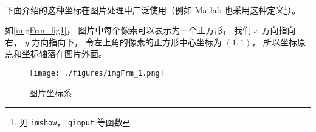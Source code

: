 
下面介绍的这种坐标在图片处理中广泛使用（例如 Matlab 也采用这种定义\footnote{见 \lstinline|imshow|， \lstinline|ginput| 等函数}）。

如\autoref{imgFrm_fig1}， 图片中每个像素可以表示为一个正方形， 我们 $x$ 方向指向右， $y$ 方向指向下， 令左上角的像素的正方形中心坐标为 $(1, 1)$， 所以坐标原点和坐标轴落在图片外面。

\begin{figure}[ht]
\centering
\texttt{[image: ./figures/imgFrm\_1.png]}
\caption{图片坐标系} \label{imgFrm_fig1}
\end{figure}
